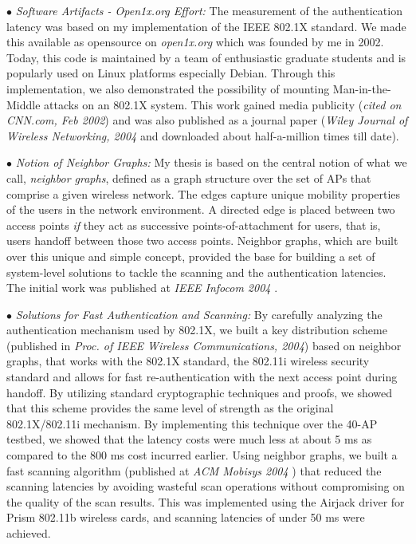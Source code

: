 \documentclass[10pt,letterpaper]{article}
\begin{document}
$\bullet$ {\it Software Artifacts - Open1x.org Effort:} The measurement of the authentication latency was based on my
implementation of the IEEE 802.1X standard.  We made this available as opensource on {\it open1x.org} which was founded
by me in 2002. Today, this code is maintained by a team of enthusiastic  graduate students and is popularly used on Linux
platforms especially Debian. Through this implementation, we also demonstrated the possibility of mounting
Man-in-the-Middle attacks on an 802.1X system. This work gained media publicity ({\it cited on CNN.com, Feb 2002}) and
was also published as a journal paper ({\it Wiley Journal of Wireless Networking, 2004 } and downloaded about half-a-million times till date). 
  
$\bullet$ {\it Notion of Neighbor Graphs:} My thesis is based on the central notion of what we call, {\it
neighbor graphs}, defined as a graph structure over the set of APs that comprise a given wireless
network. The edges capture unique mobility properties of the users in the network environment. A directed edge is placed
between two access points {\it if} they act as successive points-of-attachment for users, that is, users handoff between
those two access points. Neighbor graphs, which are built over this unique and simple concept, provided the base for
building a set of system-level solutions to tackle the scanning and the authentication latencies. The initial work was
published at {\it IEEE Infocom 2004 }.

$\bullet$  {\it Solutions for Fast Authentication and Scanning:} By carefully analyzing the authentication
mechanism used by 802.1X, we built a key distribution scheme (published in {\it Proc. of IEEE Wireless Communications,
2004}) based on neighbor graphs, that works with the 802.1X
standard, the 802.11i wireless security standard and allows for fast re-authentication with the next access point
during handoff. By utilizing standard cryptographic techniques and proofs, we showed that this scheme provides the same
level of strength as the original 802.1X/802.11i mechanism. By implementing this technique over the 40-AP testbed, we 
showed that the latency costs were much less at about 5 ms as compared to the 800 ms cost incurred earlier.  
Using neighbor graphs, we built a fast scanning algorithm (published at {\it ACM Mobisys
2004 }) that reduced the scanning latencies by avoiding wasteful scan operations without compromising on the quality of
the scan results. This was implemented using the Airjack driver for Prism  802.11b wireless cards, and scanning
latencies of under 50 ms were achieved. 
\end{document}
